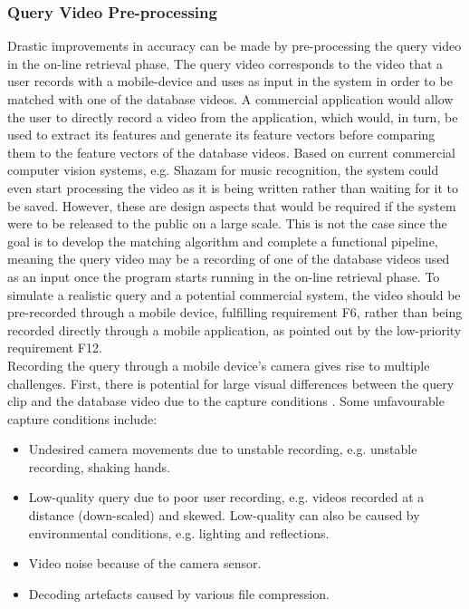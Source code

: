 
\subsubsection{Query Video Pre-processing}
\label{sec:design-query-video-processing}

Drastic improvements in accuracy can be made by pre-processing the query video in the on-line retrieval phase. The query video corresponds to the video that a user records with a mobile-device and uses as input in the system in order to be matched with one of the database videos. A commercial application would allow the user to directly record a video from the application, which would, in turn, be used to extract its features and generate its feature vectors before comparing them to the feature vectors of the database videos. Based on current commercial computer vision systems, e.g. Shazam for music recognition, the system could even start processing the video as it is being written rather than waiting for it to be saved. However, these are design aspects that would be required if the system were to be released to the public on a large scale. This is not the case since the goal is to develop the matching algorithm and complete a functional pipeline, meaning the query video may be a recording of one of the database videos used as an input once the program starts running in the on-line retrieval phase. To simulate a realistic query and a potential commercial system, the video should be pre-recorded through a mobile device, fulfilling requirement F6, rather than being recorded directly through a mobile application, as pointed out by the low-priority requirement F12.\\

Recording the query through a mobile device's camera gives rise to multiple challenges. First, there is potential for large visual differences between the query clip and the database video due to the capture conditions \cite{liu2014mobilevideosearch} \cite{wang2016actionregonition}. Some unfavourable capture conditions include:
\begin{itemize}
    \item Undesired camera movements due to unstable recording, e.g. unstable recording, shaking hands.
    \item Low-quality query due to poor user recording, e.g. videos recorded at a distance (down-scaled) and skewed. Low-quality can also be caused by environmental conditions, e.g. lighting and reflections.
    \item Video noise because of the camera sensor.
    \item Decoding artefacts caused by various file compression.
\end{itemize}

